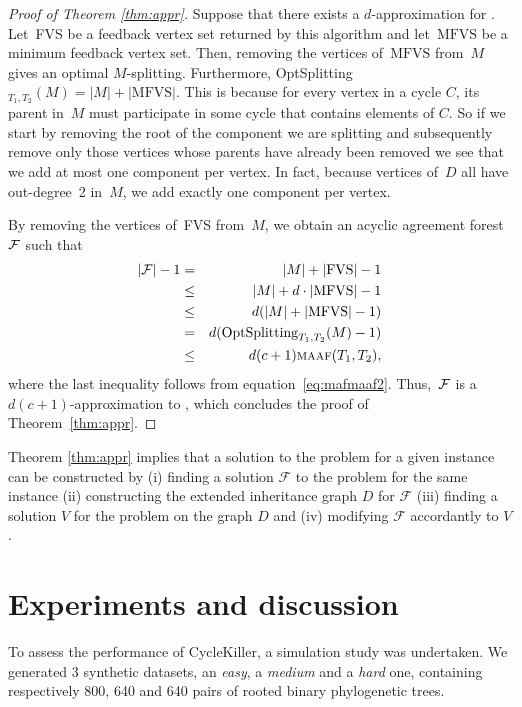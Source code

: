 \begin{proof}[{Proof of Theorem \ref{thm:appr}}]
Suppose that there exists a $d$-approximation for {\sc \dfvs}. Let~FVS be a feedback vertex set returned by this algorithm and let~$\text{MFVS}$ be a minimum feedback vertex set. Then, removing the vertices of~$\text{MFVS}$ from~$M$ gives an optimal $M$-splitting. Furthermore, {OptSplitting$_{T_1,T_2}(M) = |M|+|\text{MFVS}|$}. This is because for every vertex in a cycle $C$, its parent in~$M$ must participate in some cycle that contains elements of $C$. So if we start by removing the root of the component we are splitting and subsequently remove only those vertices whose parents have already been removed we see that we add at most one component per vertex. In fact, because vertices of~$D$ all have out-degree~2 in~$M$, we add exactly one component per vertex.

By removing the vertices of~FVS from~$M$, we obtain an acyclic agreement forest~${\mathcal F}$ such that
\begin{eqnarray*}
|{\mathcal F}| - 1 & = & |M| + |\text{FVS}| - 1\\
& \leq & |M| + d\cdot |\text{MFVS}|  - 1\\
& \leq & d (|M| +|\text{MFVS}| - 1)\\
& = & d (\text{OptSplitting}_{T_1,T_2}(M) - 1)\\
& \leq & d (c+1) \text{{\sc maaf}}(T_1,T_2),
\end{eqnarray*}
where the last inequality follows from equation~\eqref{eq:mafmaaf2}. Thus,~${\mathcal F}$ is a $d(c+1)$-approximation to \maaf, which concludes the proof of Theorem~\ref{thm:appr}.
\end{proof}

{Theorem \ref{thm:appr} implies that a solution to the \maaf problem for a given instance can be constructed by (i)   finding a solution $\mathcal{F}$  to the \maf problem for the same instance  (ii) constructing the  extended inheritance graph $D$ for $\mathcal{F}$ (iii) finding a solution $V$ for the \dfvs problem on the graph $D$ and (iv) modifying $\mathcal{F}$ accordantly to $V$.}



\section{Experiments and discussion}\label{sec:binexp}

To assess the performance of {\sc CycleKiller}, a simulation study was undertaken. We generated 3 synthetic datasets, an \emph{easy}, a \emph{medium} and a \emph{hard} one, containing respectively 800, 640 and 640 pairs of rooted binary phylogenetic trees. 

